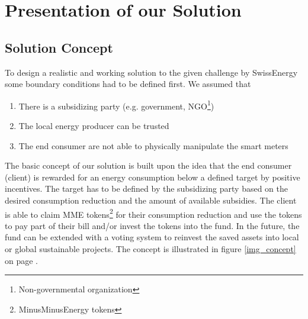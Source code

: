 \documentclass[11pt]{article}
\begin{document}
\section{Presentation of our Solution}

\subsection{Solution Concept}
To design a realistic and working solution to the given challenge by SwissEnergy some boundary conditions had to be defined first. We assumed that
\begin{enumerate}\itemsep0pt
	\item There is a subsidizing party (e.g. government, NGO\footnote{Non-governmental organization})
	\item The local energy producer can be trusted
	\item The end consumer are not able to physically manipulate the smart meters
\end{enumerate}
The basic concept of our solution is built upon the idea that the end consumer (client) is rewarded for an energy consumption below a defined target by positive incentives. The target has to be defined by the subsidizing party based on the desired consumption reduction and the amount of available subsidies. The client is able to claim MME tokens\footnote{MinusMinusEnergy tokens} for their consumption reduction and use the tokens to pay part of their bill and/or invest the tokens into the fund. In the future, the fund can be extended with a voting system to reinvest the saved assets into local or global sustainable projects. The concept is illustrated in figure \ref{img_concept} on page \pageref{img_concept}.
\end{document}
